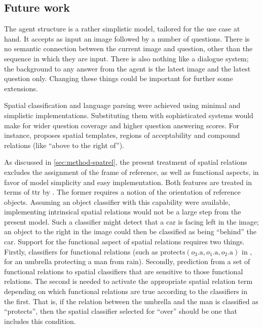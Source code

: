 \subsection{Future work}
\label{sec:futurework}

The agent structure is a rather simplistic model, tailored for the use case at hand.
It accepts as input an image followed by a number of questions.
There is no semantic connection between the current image and question, other than the sequence in which they are input.
There is also nothing like a dialogue system;
the background to any answer from the agent is the latest image and the latest question only.
Changing these things could be important for further some extensions.

Spatial classification and language parsing were achieved using minimal and simplistic implementations.
Substituting them with sophisticated systems would make for wider question coverage and higher question answering scores.
For instance, \cite{LoganComputationalAnalysisApprehension1996} proposes spatial templates, regions of acceptability and compound relations (like ``above to the right of'').

As discussed in \autoref{sec:method-spatrel}, the present treatment of spatial relations excludes the assignment of the frame of reference, as well as functional aspects, in favor of model simplicity and easy implementation.
Both features are treated in terms of \gls{ttr} by \cite{ttrspat}.
The former requires a notion of the orientation of reference objects.
Assuming an object classifier with this capability were available, implementing intrinsical spatial relations would not be a large step from the present model.
Such a classifier might detect that a car is facing left in the image;
an object to the right in the image could then be classified as being ``behind'' the car.
Support for the functional aspect of spatial relations requires two things.
Firstly, classifiers for functional relations (such as $\text{protects}(o_3\text{.a}, o_1\text{.a}, o_2\text{.a})$ in \cite{ttrspat}, for an umbrella protecting a man from rain).
Secondly, prediction from a set of functional relations to spatial classifiers that are sensitive to those functional relations.
The second is needed to activate the appropriate spatial relation term depending on which functional relations are true according to the classifiers in the first.
That is, if the relation between the umbrella and the man is classified as ``protects'', then the spatial classifier selected for ``over'' should be one that includes this condition.


